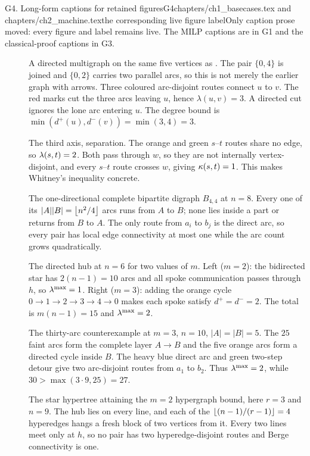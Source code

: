 \begin{offcut}{G4. Long-form captions for retained figures}{G4}{chapters/ch1\_basecases.tex and chapters/ch2\_machine.tex}{the corresponding live figure label}{Only caption prose moved: every figure and label remains live. The MILP captions are in G1 and the classical-proof captions in G3.}
\begin{description}
\item[]
A directed multigraph on the same five vertices as . The pair $\{0,4\}$ is joined and $\{0,2\}$ carries two parallel arcs, so this is not merely the earlier graph with arrows. Three coloured arc-disjoint routes connect $u$ to $v$. The red marks cut the three arcs leaving $u$, hence $\lambda(u,v)=3$. A directed cut ignores the lone arc entering $u$. The degree bound is $\min(d^+(u),d^-(v))=\min(3,4)=3$.

\item[]
The third axis, separation. The orange and green $s$--$t$ routes share no edge, so $\lambda(s,t)=2$. Both pass through $w$, so they are not internally vertex-disjoint, and every $s$--$t$ route crosses $w$, giving $\kappa(s,t)=1$. This makes Whitney's inequality concrete.

\item[]
The one-directional complete bipartite digraph $B_{4,4}$ at $n=8$. Every one of its $|A||B|=\left\lfloor n^2/4 \right\rfloor$ arcs runs from $A$ to $B$; none lies inside a part or returns from $B$ to $A$. The only route from $a_i$ to $b_j$ is the direct arc, so every pair has local edge connectivity at most one while the arc count grows quadratically.

\item[]
The directed hub at $n=6$ for two values of $m$. Left ($m=2$): the bidirected star has $2(n-1)=10$ arcs and all spoke communication passes through $h$, so $\lambda^{\max}=1$. Right ($m=3$): adding the orange cycle $0\to1\to2\to3\to4\to0$ makes each spoke satisfy $d^+=d^-=2$. The total is $m(n-1)=15$ and $\lambda^{\max}=2$.

\item[]
The thirty-arc counterexample at $m=3$, $n=10$, $|A|=|B|=5$. The $25$ faint arcs form the complete layer $A\to B$ and the five orange arcs form a directed cycle inside $B$. The heavy blue direct arc and green two-step detour give two arc-disjoint routes from $a_1$ to $b_2$. Thus $\lambda^{\max}=2$, while $30>\max(3\cdot9,25)=27$.

\item[]
The star hypertree attaining the $m=2$ hypergraph bound, here $r=3$ and $n=9$. The hub lies on every line, and each of the $\left\lfloor (n-1)/(r-1) \right\rfloor=4$ hyperedges hangs a fresh block of two vertices from it. Every two lines meet only at $h$, so no pair has two hyperedge-disjoint routes and Berge connectivity is one.


\end{description}
\end{offcut}
